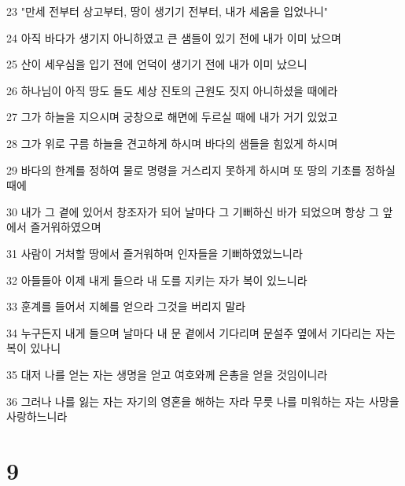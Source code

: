 \par 23 "만세 전부터 상고부터, 땅이 생기기 전부터, 내가 세움을 입었나니"
\par 24 아직 바다가 생기지 아니하였고 큰 샘들이 있기 전에 내가 이미 났으며
\par 25 산이 세우심을 입기 전에 언덕이 생기기 전에 내가 이미 났으니
\par 26 하나님이 아직 땅도 들도 세상 진토의 근원도 짓지 아니하셨을 때에라
\par 27 그가 하늘을 지으시며 궁창으로 해면에 두르실 때에 내가 거기 있었고
\par 28 그가 위로 구름 하늘을 견고하게 하시며 바다의 샘들을 힘있게 하시며
\par 29 바다의 한계를 정하여 물로 명령을 거스리지 못하게 하시며 또 땅의 기초를 정하실 때에
\par 30 내가 그 곁에 있어서 창조자가 되어 날마다 그 기뻐하신 바가 되었으며 항상 그 앞에서 즐거워하였으며
\par 31 사람이 거처할 땅에서 즐거워하며 인자들을 기뻐하였었느니라
\par 32 아들들아 이제 내게 들으라 내 도를 지키는 자가 복이 있느니라
\par 33 훈계를 들어서 지혜를 얻으라 그것을 버리지 말라
\par 34 누구든지 내게 들으며 날마다 내 문 곁에서 기다리며 문설주 옆에서 기다리는 자는 복이 있나니
\par 35 대저 나를 얻는 자는 생명을 얻고 여호와께 은총을 얻을 것임이니라
\par 36 그러나 나를 잃는 자는 자기의 영혼을 해하는 자라 무릇 나를 미워하는 자는 사망을 사랑하느니라

\chapter{9}

